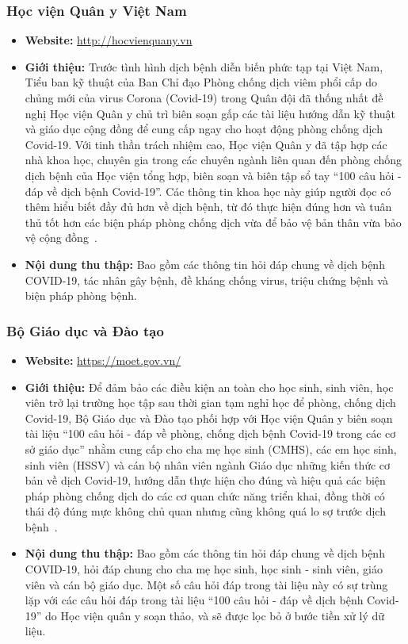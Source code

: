 \documentclass[runningheads]{llncs}
\begin{document}
\subsubsection{Học viện Quân y Việt Nam}
\begin{itemize}
\item \textbf{Website:} \url{http://hocvienquany.vn}

\item \textbf{Giới thiệu:}
Trước tình hình dịch bệnh diễn biến phức tạp tại Việt Nam, Tiểu ban kỹ thuật của Ban Chỉ đạo Phòng chống dịch viêm phổi cấp do chủng mới của virus Corona (Covid-19) trong Quân đội đã thống nhất đề nghị Học viện Quân y chủ trì biên soạn gấp các tài liệu hướng dẫn kỹ thuật và giáo dục cộng đồng để cung cấp ngay cho hoạt động phòng chống dịch Covid-19. Với tinh thần trách nhiệm cao, Học viện Quân y đã tập hợp các nhà khoa học, chuyên gia trong các chuyên ngành liên quan đến phòng chống dịch bệnh của Học viện tổng hợp, biên soạn và biên tập sổ tay “100 câu hỏi - đáp về dịch bệnh Covid-19”. Các thông tin khoa học này giúp người đọc có thêm hiểu biết đầy đủ hơn về dịch bệnh, từ đó thực hiện đúng hơn và tuân thủ tốt hơn các biện pháp phòng chống dịch vừa để bảo vệ bản thân vừa bảo vệ cộng đồng~\cite{ref_book1}.
\item \textbf{Nội dung thu thập:} Bao gồm các thông tin hỏi đáp chung về dịch bệnh COVID-19, tác nhân gây bệnh, đề kháng chống virus, triệu chứng bệnh và biện pháp phòng bệnh.


\end{itemize}

\subsubsection{Bộ Giáo dục và Đào tạo}
\begin{itemize}
\item \textbf{Website:} \url{https://moet.gov.vn/}

\item \textbf{Giới thiệu:}
Để đảm bảo các điều kiện an toàn cho học sinh, sinh viên, học viên trở lại trường học tập sau
thời gian tạm nghỉ học để phòng, chống dịch Covid-19, Bộ Giáo dục và
Đào tạo phối hợp với Học viện Quân y biên soạn tài liệu “100 câu hỏi - đáp về phòng, chống dịch bệnh Covid-19 trong các cơ sở giáo dục” nhằm cung cấp cho cha mẹ học sinh (CMHS), các em học sinh, sinh
viên (HSSV) và cán bộ nhân viên ngành Giáo dục những kiến thức cơ
bản về dịch Covid-19, hướng dẫn thực hiện cho đúng và hiệu quả các
biện pháp phòng chống dịch do các cơ quan chức năng triển khai,
đồng thời có thái độ đúng mực không chủ quan nhưng cũng không
quá lo sợ trước dịch bệnh~\cite{ref_book2}.
\item \textbf{Nội dung thu thập:} Bao gồm các thông tin hỏi đáp chung về dịch bệnh COVID-19, hỏi đáp chung cho cha mẹ học sinh, học sinh - sinh viên, giáo viên và cán bộ giáo dục. Một số câu hỏi đáp trong tài liệu này có sự trùng lặp với các câu hỏi đáp trong tài liệu “100 câu hỏi - đáp về dịch bệnh Covid-19” do Học viện quân y soạn thảo, và sẽ được lọc bỏ ở bước tiền xử lý dữ liệu.

\end{itemize}
\end{document}

